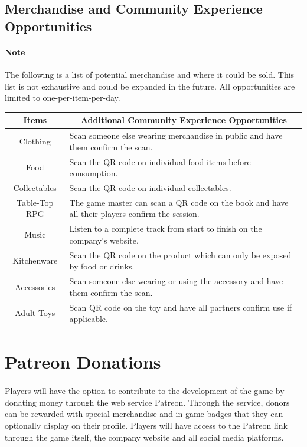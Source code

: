 \subsection{Merchandise and Community Experience Opportunities}

\paragraph{Note} The following is a list of potential merchandise and where it could be sold. This list is not exhaustive and could be expanded in the future. All opportunities are limited to one-per-item-per-day.

\begin{table}[h!]
    \centering
    \begin{tabular}{|c|l|}
        \hline
        \textbf{Items} & \multicolumn{1}{|c|}{\textbf{Additional Community Experience Opportunities}}\\
        \hline
        Clothing & Scan someone else wearing merchandise in public and have them confirm the scan.\\
        \hline
        Food & Scan the QR code on individual food items before consumption.\\
        \hline
        Collectables & Scan the QR code on individual collectables.\\
        \hline
        Table-Top RPG & The game master can scan a QR code on the book and have all their players confirm the session.\\
        \hline
        Music & Listen to a complete track from start to finish on the company's website.\\
        \hline
        Kitchenware & Scan the QR code on the product which can only be exposed by food or drinks.\\
        \hline
        Accessories & Scan someone else wearing or using the accessory and have them confirm the scan.\\
        \hline
        Adult Toys & Scan QR code on the toy and have all partners confirm use if applicable.\\
        \hline
    \end{tabular}
\end{table}

\section{Patreon Donations}

\paragraph{} Players will have the option to contribute to the development of the game by donating money through the web service Patreon. Through the service, donors can be rewarded with special merchandise and in-game badges that they can optionally display on their profile. Players will have access to the Patreon link through the game itself, the company website and all social media platforms.

